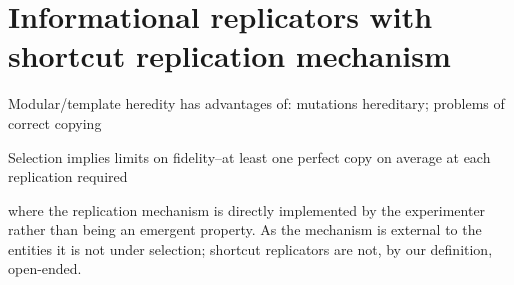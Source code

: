 \section{Informational replicators with shortcut replication mechanism}
\begin{NOTES}
Modular/template heredity has advantages of: mutations hereditary; problems of correct copying \parencite{Eigen1977}

Selection implies limits on fidelity--at least one perfect copy on average at each replication required \parencite{Eigen1977}

\Cite{BanzhafBaumgaertnerBeslonEtAl2016} where the replication mechanism is directly implemented by the experimenter rather than being an emergent property. As the mechanism is external to the entities it is not under selection; shortcut replicators are not, by our definition, open-ended.



\end{NOTES}
